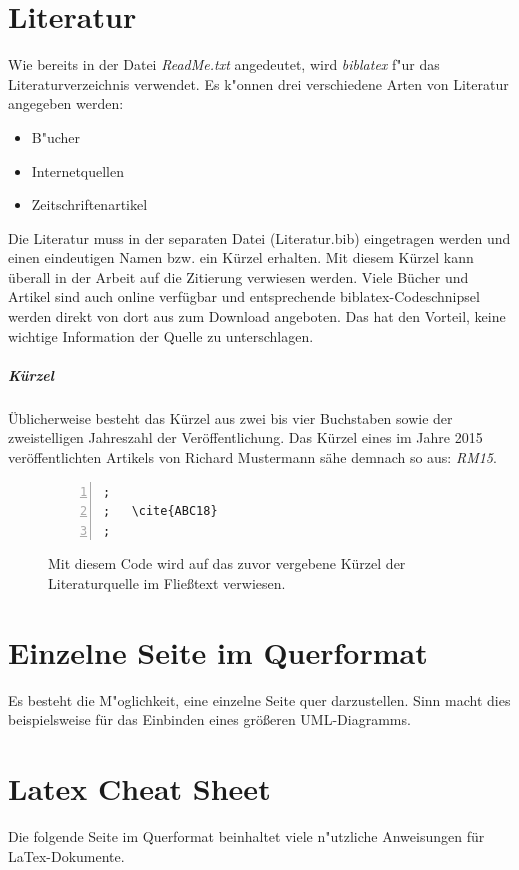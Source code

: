 \section{Literatur}
\label{sec:Literatur}

Wie bereits in der Datei \textit{ReadMe.txt} angedeutet, wird \textit{biblatex} f"ur das Literaturverzeichnis verwendet. Es k"onnen drei verschiedene Arten von Literatur angegeben werden:

\begin{itemize}
\item B"ucher\cite{wissentschaftlichesArbeitMitLatex}
\item Internetquellen\cite{zitieren13a}
\item Zeitschriftenartikel
\end{itemize}

Die Literatur muss in der separaten Datei (Literatur.bib) eingetragen werden und einen eindeutigen Namen bzw. ein Kürzel erhalten. Mit diesem Kürzel kann überall in der Arbeit auf die Zitierung verwiesen werden. Viele Bücher und Artikel sind auch online verfügbar und entsprechende biblatex-Codeschnipsel werden direkt von dort aus zum Download angeboten. Das hat den Vorteil, keine wichtige Information der Quelle zu unterschlagen.

\subparagraph{Kürzel}
Üblicherweise besteht das Kürzel aus zwei bis vier Buchstaben sowie der zweistelligen Jahreszahl der Veröffentlichung. Das Kürzel eines im Jahre 2015 veröffentlichten Artikels von Richard Mustermann sähe demnach so aus: \textit{RM15}.

\FloatBarrier
\begin{figure}[htb]
\begin{lstlisting}[backgroundcolor={\color{white}},
basicstyle={\normalsize\sffamily},
breaklines=true,
frame={bottomline,topline, rightline},
language=HTML,
numbers=left,
showstringspaces=false,
xleftmargin=22pt]	
;
;	\cite{ABC18}
;           
\end{lstlisting}
  \caption[Einbinden einer Literaturquelle]{Mit diesem Code wird auf das zuvor vergebene Kürzel der Literaturquelle im Fließtext verwiesen.}
\label{lst:literaturenquelle}
\end{figure}


\begin{landscape}


\section{Einzelne Seite im Querformat}
\label{sec:Querformat}

Es besteht die M"oglichkeit, eine einzelne Seite quer darzustellen. Sinn macht dies beispielsweise für das Einbinden eines größeren UML-Diagramms.

\section{Latex Cheat Sheet}
\label{sec:latexCheatsheet}

Die folgende Seite im Querformat beinhaltet viele n"utzliche Anweisungen für LaTex-Dokumente.

\end{landscape}

 



\cleardoublepage
